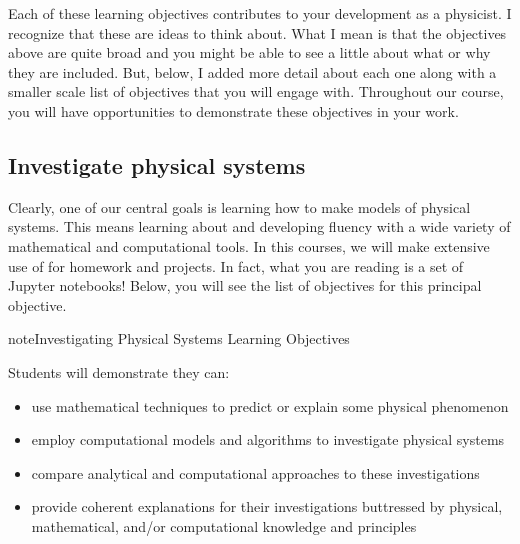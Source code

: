 \documentclass[letterpaper,10pt,english]{jupyterBook}
\begin{document}
\sphinxAtStartPar
Each of these learning objectives contributes to your development as a physicist. I recognize that these are  ideas to think about. What I mean is that the objectives above are quite broad and you might be able to see a little about what or why they are included. But, below, I added more detail about each one along with a smaller scale list of objectives that you will engage with. Throughout our course, you will have opportunities to demonstrate these objectives in your work. 


\subsection{Investigate physical systems}
\label{\detokenize{content/0_course/goals:investigate-physical-systems}}
\sphinxAtStartPar
Clearly, one of our central goals is learning how to make models of physical systems. This means learning about and developing fluency with a wide variety of mathematical and computational tools. In this courses, we will make extensive use of  for homework and projects. In fact, what you are reading is a set of Jupyter notebooks! Below, you will see the list of objectives for this principal objective.

\begin{sphinxadmonition}{note}{Investigating Physical Systems Learning Objectives}

\sphinxAtStartPar
Students will demonstrate they can:
\begin{itemize}
\item {} 
\sphinxAtStartPar
use mathematical techniques to predict or explain some physical phenomenon

\item {} 
\sphinxAtStartPar
employ computational models and algorithms to investigate physical systems

\item {} 
\sphinxAtStartPar
compare analytical and computational approaches to these investigations

\item {} 
\sphinxAtStartPar
provide coherent explanations for their investigations buttressed by physical, mathematical, and/or computational knowledge and principles

\end{itemize}
\end{sphinxadmonition}
\end{document}

